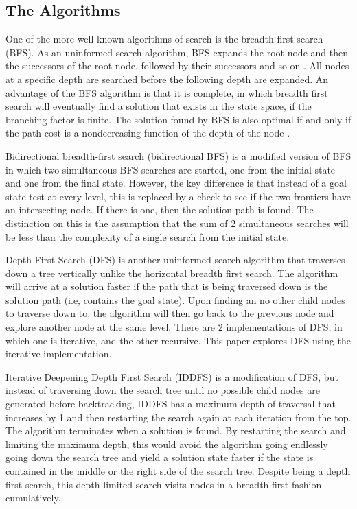 \documentclass[conference]{IEEEtran}
\begin{document}
\subsection{The Algorithms}

One of the more well-known algorithms of search is the breadth-first search (BFS). As an uninformed search algorithm, BFS expands the root node and then the successors of the root node, followed by their successors and so on \cite{Textbook01}. All nodes at a specific depth are searched before the following depth are expanded. An advantage of the BFS algorithm is that it is complete, in which breadth first search will eventually find a solution that exists in the state space, if the branching factor is finite. The solution found by BFS is also optimal if and only if the path cost is a nondecreasing function of the depth of the node \cite{Textbook01}.

Bidirectional breadth-first search (bidirectional BFS) is a modified version of BFS in which two simultaneous BFS searches are started, one from the initial state and one from the final state. However, the key difference is that instead of a goal state test at every level, this is replaced by a check to see if the two frontiers have an intersecting node. If there is one, then the solution path is found. The distinction on this is the assumption that the sum of 2 simultaneous searches will be less than the complexity of a single search from the initial state. 

Depth First Search (DFS) is another uninformed search algorithm that traverses down a tree vertically unlike the horizontal breadth first search. The algorithm will arrive at a solution faster if the path that is being traversed down is the solution path (i.e, contains the goal state). Upon finding an no other child nodes to traverse down to, the algorithm will then go back to the previous node and explore another node at the same level. There are 2 implementations of DFS, in which one is iterative, and the other recursive. This paper explores DFS using the iterative implementation.

Iterative Deepening Depth First Search (IDDFS) is a modification of DFS, but instead of traversing down the search tree until no possible child nodes are generated before backtracking, IDDFS has a maximum depth of traversal that increases by 1 and then restarting the search again at each iteration from the top. The algorithm terminates when a solution is found. By restarting the search and limiting the maximum depth, this would avoid the algorithm going endlessly going down the search tree and yield a solution state faster if the state is contained in the middle or the right side of the search tree. Despite being a depth first search, this depth limited search visits nodes in a breadth first fashion cumulatively. 
\end{document}
